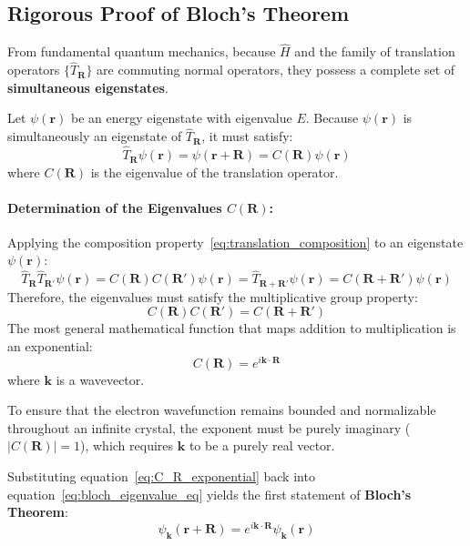 \documentclass[11pt,a4paper]{article}
\newcommand{\vb}[1]{\mathbf{#1}}
\begin{document}
\subsection{Rigorous Proof of Bloch's Theorem}
From fundamental quantum mechanics, because $\hat{H}$ and the family of translation operators $\{\hat{T}_{\vb{R}}\}$ are commuting normal operators, they possess a complete set of \textbf{simultaneous eigenstates}.

Let $\psi(\vb{r})$ be an energy eigenstate with eigenvalue $E$. Because $\psi(\vb{r})$ is simultaneously an eigenstate of $\hat{T}_{\vb{R}}$, it must satisfy:
\begin{equation}
\hat{T}_{\vb{R}}\psi(\vb{r}) = \psi(\vb{r} + \vb{R}) = C(\vb{R})\psi(\vb{r})
\label{eq:bloch_eigenvalue_eq}
\end{equation}
where $C(\vb{R})$ is the eigenvalue of the translation operator.

\paragraph{Determination of the Eigenvalues $C(\vb{R})$:}
Applying the composition property~\eqref{eq:translation_composition} to an eigenstate $\psi(\vb{r})$:
\begin{equation}
\hat{T}_{\vb{R}}\hat{T}_{\vb{R}'}\psi(\vb{r}) = C(\vb{R})C(\vb{R}')\psi(\vb{r}) = \hat{T}_{\vb{R}+\vb{R}'}\psi(\vb{r}) = C(\vb{R}+\vb{R}')\psi(\vb{r})
\end{equation}
Therefore, the eigenvalues must satisfy the multiplicative group property:
\begin{equation}
C(\vb{R})C(\vb{R}') = C(\vb{R}+\vb{R}')
\end{equation}
The most general mathematical function that maps addition to multiplication is an exponential:
\begin{equation}
C(\vb{R}) = e^{i\vb{k}\cdot\vb{R}}
\label{eq:C_R_exponential}
\end{equation}
where $\vb{k}$ is a wavevector. 

To ensure that the electron wavefunction remains bounded and normalizable throughout an infinite crystal, the exponent must be purely imaginary ($|C(\vb{R})| = 1$), which requires $\vb{k}$ to be a purely real vector.

Substituting equation~\eqref{eq:C_R_exponential} back into equation~\eqref{eq:bloch_eigenvalue_eq} yields the first statement of \textbf{Bloch's Theorem}:
\begin{equation}
\boxed{\psi_{\vb{k}}(\vb{r} + \vb{R}) = e^{i\vb{k}\cdot\vb{R}}\psi_{\vb{k}}(\vb{r})}
\label{eq:bloch_statement_1}
\end{equation}
\end{document}
